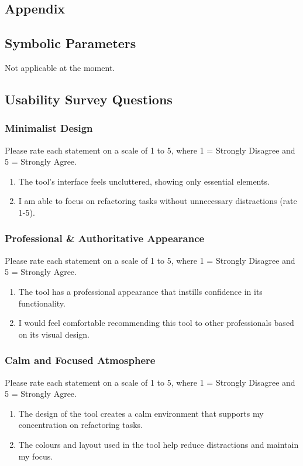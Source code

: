 \documentclass[12pt, titlepage]{article}
\begin{document}
\begin{appendices}

\section{Appendix}


\subsection{Symbolic Parameters}

Not applicable at the moment.

\subsection{Usability Survey Questions} \label{A.2}

\subsubsection*{Minimalist Design}
Please rate each statement on a scale of 1 to 5, where 1 = Strongly Disagree and 5 = Strongly Agree.
\begin{enumerate}
  \item The tool's interface feels uncluttered, showing only essential elements.
  \item I am able to focus on refactoring tasks without unnecessary distractions (rate 1-5).
\end{enumerate}

\subsubsection*{Professional \& Authoritative Appearance}
Please rate each statement on a scale of 1 to 5, where 1 = Strongly Disagree and 5 = Strongly Agree.
\begin{enumerate}
  \item The tool has a professional appearance that instills confidence in its functionality.
  \item I would feel comfortable recommending this tool to other professionals based on its visual design.
\end{enumerate}

\subsubsection*{Calm and Focused Atmosphere}
Please rate each statement on a scale of 1 to 5, where 1 = Strongly Disagree and 5 = Strongly Agree.
\begin{enumerate}
  \item The design of the tool creates a calm environment that supports my concentration on refactoring tasks.
  \item The colours and layout used in the tool help reduce distractions and maintain my focus.
\end{enumerate}


\end{appendices}
\end{document}

